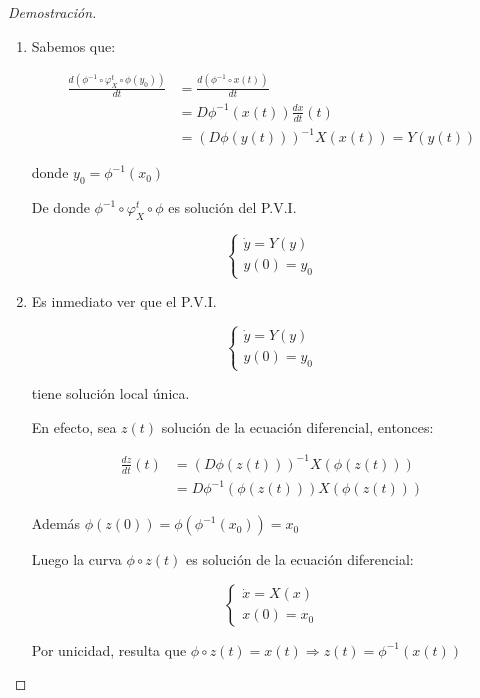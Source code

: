 \begin{proof}[Demostración]
\begin{enumerate}
		\item Sabemos que:
		
		\begin{align*}
			\frac{d(\phi^{-1} \circ \varphi_X^t \circ \phi(y_0))}{dt} &= \frac{d(\phi^{-1} \circ x(t))}{dt} \\
			&= D\phi^{-1}(x(t)) \frac{dx}{dt}(t)  \\
			&= (D\phi(y(t)))^{-1} X(x(t)) = Y(y(t))
		\end{align*}
		
		donde $y_0 = \phi^{-1}(x_0)$
		
		De donde $\phi^{-1} \circ \varphi_X^t \circ \phi$ es solución del P.V.I.
		
		\begin{equation*}	
			\begin{cases}
				\dot{y} = Y(y) \\
				y(0) = y_0
			\end{cases}
		\end{equation*}
		
		\item Es inmediato ver que el P.V.I.
		
		\begin{equation*}	
			\begin{cases}
				\dot{y} = Y(y) \\
				y(0) = y_0
			\end{cases}
		\end{equation*} 
		
		tiene solución local única.
		
		En efecto, sea $z(t)$ solución de la ecuación diferencial, entonces:
		
		\begin{align*}
			\frac{dz}{dt}(t) &= (D\phi(z(t)))^{-1} X(\phi(z(t))) \\
			&= D\phi^{-1}(\phi(z(t))) X(\phi(z(t))) 
		\end{align*}
		
		Además $\phi(z(0)) = \phi(\phi ^{-1} (x_0)) = x_0 $
		
		Luego la curva $\phi \circ z(t)$ es solución de la ecuación diferencial:
		
		\begin{equation*}
			\begin{cases}
				\dot{x} = X(x) \\
				x(0) = x_0
			\end{cases}
		\end{equation*}
		
		Por unicidad, resulta que $\phi \circ z(t) = x(t) \Rightarrow z(t) = \phi^{-1}(x(t))$
	\end{enumerate}
\end{proof}

